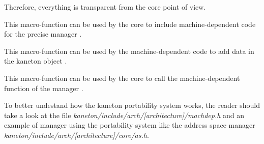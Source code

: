 Therefore, everything is transparent from the core point of view.

	 {
	   This macro-function can be used by the core to include
	   machine-dependent code for the precise manager .
	 }

	 {
	   This macro-function can be used by the machine-dependent code
	   to add data in the kaneton object .
	 }

	 {
	   This macro-function can be used by the core to call the
	   machine-dependent function  of the manager
	   .
	 }

To better undestand how the kaneton portability system works, the reader
should take a look at the file
\textit{kaneton/include/arch/[architecture]/machdep.h}
and an example of manager using the portability system like the address
space manager
\textit{kaneton/include/arch/[architecture]/core/as.h}.

